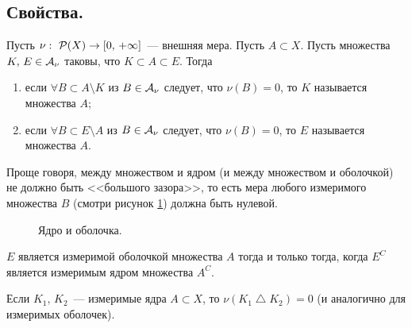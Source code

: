 \newpage
{}

\subsection{Свойства.}

\begin{definition}
    Пусть $\nu:\ \mathcal{P}(X)\to[0,\, +\infty]$~--- внешняя мера. Пусть $A\subset X$. Пусть множества $K,\, E\in\mathcal{A}_{\nu}$ таковы, что
    $K\subset A\subset E$. Тогда
    \begin{enumerate}
        \item если $\forall B\subset A\setminus K$ из $B\in\mathcal{A}_{\nu}$ следует, что $\nu(B)=0$, то $K$ называется
               множества $A$;
        \item если $\forall B\subset E\setminus A$ из $B\in\mathcal{A}_{\nu}$ следует, что $\nu(B)=0$, то $E$ называется
               множества $A$.
    \end{enumerate}

    Проще говоря, между множеством и ядром (и между множеством и оболочкой) не должно быть <<большого зазора>>, то есть мера любого измеримого
    множества $B$ (смотри рисунок \ref{fig:ker}) должна быть нулевой.
\end{definition}

\begin{figure}[!ht]
    \centering
    
    \caption{Ядро и оболочка.}
    \label{fig:ker}
\end{figure}

\begin{remark}
    $E$ является измеримой оболочкой множества $A$ тогда и только тогда, когда $E^C$ является измеримым ядром множества $A^C$.
\end{remark}

\begin{claim}
    Если $K_1,\, K_2$~--- измеримые ядра $A\subset X$, то $\nu(K_1\bigtriangleup K_2)=0$ (и аналогично для измеримых оболочек).
\end{claim}

